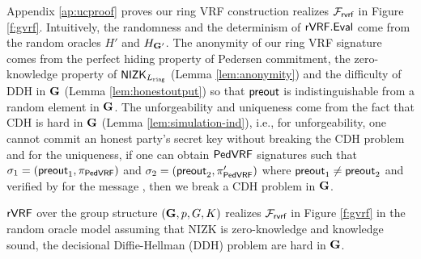 



Appendix \ref{ap:ucproof} proves our ring VRF construction realizes $ \mathcal{F}_{\textsf{rvrf}} $ in Figure \ref{f:gvrf}. Intuitively, the randomness and the determinism of $ {\mathsf{rVRF}}.{\mathsf{Eval}} $ come from the random oracles $ H' $ and $ H_{{\mathbf{G}}'} $.  The anonymity of our ring VRF signature comes from the perfect hiding property of Pedersen commitment, the zero-knowledge property of $ {\mathsf{NIZK}}_{L_{\mathtt{ring}}} $ (Lemma \ref{lem:anonymity}) and the difficulty of DDH in  $ {\mathbf{G}} $ (Lemma \ref{lem:honestoutput}) so that $ {\mathsf{preout}} $ is indistinguishable from a random element in $ {\mathbf{G}} $. The unforgeability and uniqueness come from the fact that CDH is hard in $ {\mathbf{G}} $ (Lemma \ref{lem:simulation-ind}), i.e., for unforgeability,  one cannot commit an honest party's secret key without breaking the CDH problem and for the uniqueness,  if one can obtain $ {\mathsf{PedVRF}} $ signatures such that $ \sigma_1 = ({\mathsf{preout}}_1, \pi_{{\mathsf{PedVRF}}}) $ and $ \sigma_2 = ({\mathsf{preout}}_2, \pi'_{{\mathsf{PedVRF}}}) $ where  $ {\mathsf{preout}}_1 \neq {\ensuremath{\mathsf{preout}}}_2 $  and verified by \compk for the message \msg, then we break a CDH problem in $ {\mathbf{G}} $.

\begin{theorem}\label{thm:rvrfmain}
$ {\mathsf{rVRF}} $  over the group structure $ ({\mathbf{G}},p,G,K) $ realizes $ \mathcal{F}_{\textsf{rvrf}} $ in Figure \ref{f:gvrf} in the random oracle model assuming that NIZK is zero-knowledge and knowledge sound, the decisional Diffie-Hellman (DDH) problem are hard in $ {\mathbf{G}}  $. 
\end{theorem}






\endinput





